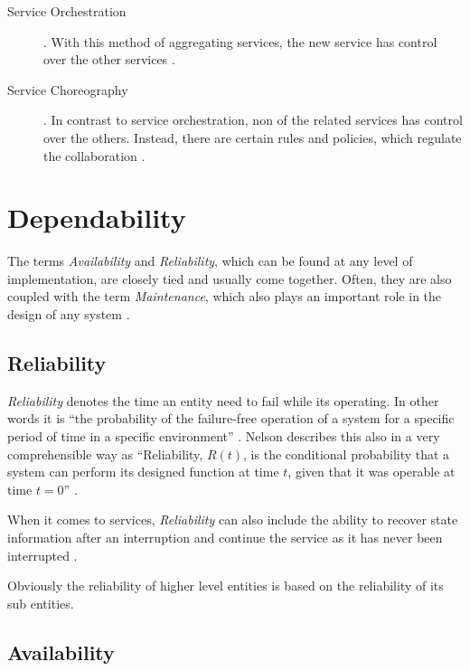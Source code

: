 \begin{description}
	\item [Service Orchestration] .
	With this method of aggregating services, the new service has control over the other services \cite{josuttis}.
	\item [Service Choreography] .
	In contrast to service orchestration, non of the related services has control over the others. Instead, there are certain rules and policies, which regulate the collaboration \cite{josuttis}.
\end{description}









\section{Dependability}

The terms \emph{Availability} and \emph{Reliability}, which can be found at any level of implementation, are closely tied and usually come together. Often, they are also coupled with the term \emph{Maintenance}, which also plays an important role in the design of any system \cite[p.116]{genesys} \cite{lessner}.

\subsection{Reliability}

\label{sec:reliability}

\emph{Reliability} denotes the time an entity need to fail while its operating. In other words it is ``the probability of the failure-free operation of a system for a specific period of time in a specific environment'' \cite[p.116]{genesys}. Nelson describes this also in a very comprehensible way as ``Reliability, $R(t)$, is the conditional probability that a system can perform its designed function at time $t$, given that it was operable at time $t=0$'' \cite{nelson}.

When it comes to services, \emph{Reliability} can also include the ability to recover state information after an interruption and continue the service as it has never been interrupted \cite{genesys}.

Obviously the reliability of higher level entities is based on the reliability of its sub entities.


\subsection{Availability}

